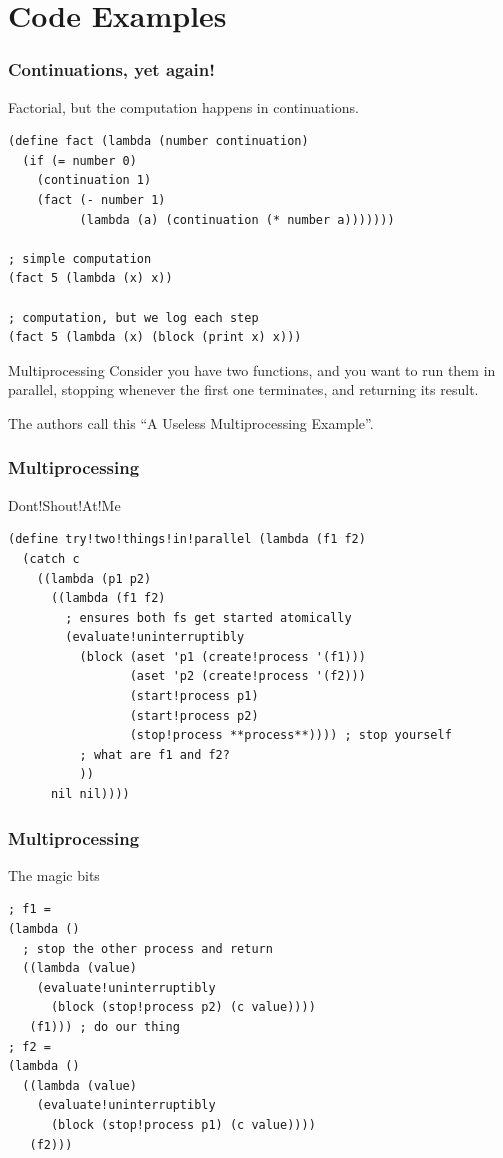 \documentclass[aspectratio=169]{beamer}
\begin{document}
  \section{Code Examples}
  \begin{frame}[fragile]
    \frametitle{Continuations, yet again!}
    \begin{listing}[H]
      \caption{Factorial, but the computation happens in continuations.}
      \begin{verbatim}
(define fact (lambda (number continuation)
  (if (= number 0)
    (continuation 1)
    (fact (- number 1)
          (lambda (a) (continuation (* number a)))))))

; simple computation
(fact 5 (lambda (x) x))

; computation, but we log each step
(fact 5 (lambda (x) (block (print x) x)))
      \end{verbatim}
    \end{listing}
  \end{frame}
  \begin{frame}{Multiprocessing}
    Consider you have two functions, and you want to run them in parallel,
    stopping whenever the first one terminates, and returning its result.

    \bigskip

    The authors call this “A Useless Multiprocessing Example”.
  \end{frame}
  \begin{frame}[fragile]
    \frametitle{Multiprocessing}
    \begin{listing}[H]
      \caption{Dont!Shout!At!Me}
      \begin{verbatim}
(define try!two!things!in!parallel (lambda (f1 f2)
  (catch c
    ((lambda (p1 p2)
      ((lambda (f1 f2)
        ; ensures both fs get started atomically
        (evaluate!uninterruptibly
          (block (aset 'p1 (create!process '(f1)))
                 (aset 'p2 (create!process '(f2)))
                 (start!process p1)
                 (start!process p2)
                 (stop!process **process**)))) ; stop yourself
          ; what are f1 and f2?
          ))
      nil nil))))
      \end{verbatim}
    \end{listing}
  \end{frame}
  \begin{frame}[fragile]
    \frametitle{Multiprocessing}
    \begin{listing}[H]
      \caption{The magic bits}
      \begin{verbatim}
; f1 = 
(lambda ()
  ; stop the other process and return
  ((lambda (value)
    (evaluate!uninterruptibly
      (block (stop!process p2) (c value))))
   (f1))) ; do our thing
; f2 =
(lambda ()
  ((lambda (value)
    (evaluate!uninterruptibly
      (block (stop!process p1) (c value))))
   (f2)))
      \end{verbatim}
    \end{listing}
  \end{frame}
\end{document}
